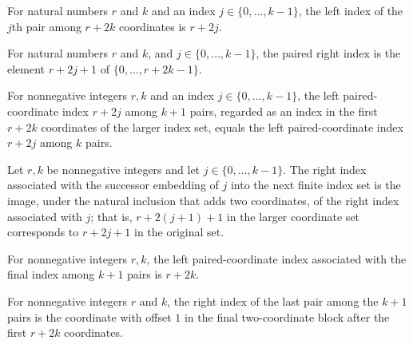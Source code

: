 \begin{definition}
\label{FABL.pairedLeftIndex}
\leanok
For natural numbers $r$ and $k$ and an index $j\in\{0,\ldots,k-1\}$, the left index of
the $j$th pair among $r+2k$ coordinates is $r+2j$.
\end{definition}

\begin{definition}
\label{FABL.pairedRightIndex}
\leanok
For natural numbers $r$ and $k$, and $j\in\{0,\ldots,k-1\}$, the paired right index is
the element $r+2j+1$ of $\{0,\ldots,r+2k-1\}$.
\end{definition}

\begin{theorem}
\label{FABL.pairedLeftIndex_castSucc}
\leanok
{}
For nonnegative integers $r,k$ and an index $j\in\{0,\ldots,k-1\}$, the left
paired-coordinate index $r+2j$ among $k+1$ pairs, regarded as an index in the first
$r+2k$ coordinates of the larger index set, equals the left paired-coordinate index
$r+2j$ among $k$ pairs.
\end{theorem}

\begin{theorem}
\label{FABL.pairedRightIndex_castSucc}
\leanok
{}
Let $r,k$ be nonnegative integers and let $j\in\{0,\ldots,k-1\}$. The right index
associated with the successor embedding of $j$ into the next finite index set is the
image, under the natural inclusion that adds two coordinates, of the right index
associated with $j$; that is, $r+2(j+1)+1$ in the larger coordinate set corresponds to
$r+2j+1$ in the original set.
\end{theorem}

\begin{theorem}
\label{FABL.pairedLeftIndex_last}
\leanok
{}
For nonnegative integers $r,k$, the left paired-coordinate index associated with the
final index among $k+1$ pairs is $r+2k$.
\end{theorem}

\begin{theorem}
\label{FABL.pairedRightIndex_last}
\leanok
{}
For nonnegative integers $r$ and $k$, the right index of the last pair among the $k+1$
pairs is the coordinate with offset $1$ in the final two-coordinate block after the
first $r+2k$ coordinates.
\end{theorem}

